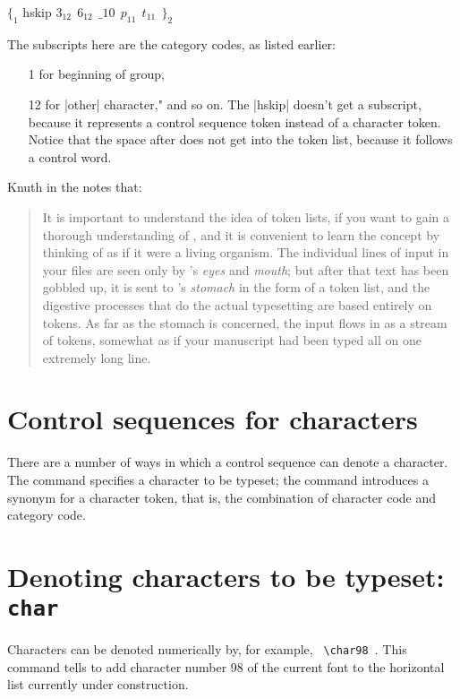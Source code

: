$ \{_{1}$ hskip $3_{12}~~6_{12}~~\_{10}~~p_{11}~~t_{11}~~\}_2 $

\medskip
The subscripts here are the category codes, as listed earlier:
\begin{itemize}
\item[1] for beginning of group,
\item[12] for |other| character," and so on. The |hskip| doesn't get a subscript, because it
represents a control sequence token instead of a character token. Notice that the space
after  does not get into the token list, because it follows a control word.
\end{itemize}

Knuth in the \texbook notes that:

\begin{quotation}

It is important to understand the idea of token lists, if you want to gain a
thorough understanding of \tex, and it is convenient to learn the concept by
thinking of \tex as if it were a living organism. The individual lines of input in your
files are seen only by \tex's \textit{eyes} and \textit{mouth}; but after that text has been gobbled
up, it is sent to \tex's \textit{stomach} in the form of a token list, and the digestive processes
that do the actual typesetting are based entirely on tokens. As far as the stomach is
concerned, the input 
flows in as a stream of tokens, somewhat as if your \tex manuscript
had been typed all on one extremely long line.
\end{quotation}

\section{Control sequences for characters}

\DescribeMacro{\char}
There are a number of ways in which a control sequence can denote a character. The \cmd{\char} command
specifies a character to be typeset; the \cmd{\let} command introduces a synonym for a character
token, that is, the combination of character code and category code.

\section{Denoting characters to be typeset: \texttt{char}}

\index{\string\char}
Characters can be denoted numerically by, for example, \verb+ \char98 +. This command tells \tex to add
character number 98 of the current font to the horizontal list currently under construction.


